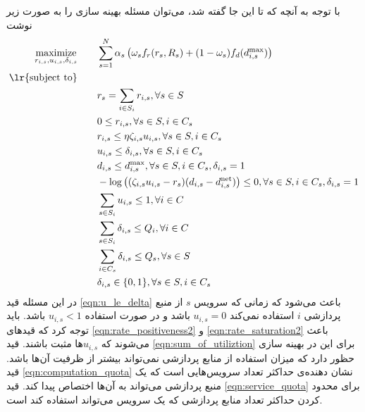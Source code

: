     با توجه به آنچه که تا این جا گفته شد،‌ می‌توان مسئله بهینه سازی را به صورت زیر نوشت
    \begin{subequations}
      \begin{align}
        \underset{r_{i,s}, u_{i,s}, \delta_{i,s}}{\text{maximize}} \qquad & \sum_{s=1}^N \alpha_s \left (\omega_s f_r(r_s, R_s) + (1-\omega_s) f_d(d_{i,s}^\text{max}) \right ) \\
        \text{\lr{subject  to}} \qquad & \nonumber \\
        & r_s = \sum_{i \in S_i} r_{i,s}, \forall s \in S \\
        & 0 \le r_{i,s}, \forall s \in S, i \in C_s \label{eqn:rate_positiveness2} \\
        & r_{i,s} \le \eta \zeta_{i,s} u_{i,s}, \forall s \in S, i \in C_s \label{eqn:rate_saturation2} \\
        & u_{i,s} \le \delta_{i,s}, \forall s \in S, i \in C_s \label{eqn:u_le_delta} \\
        & d_{i,s} \le d_{i,s}^\text{max}, \forall s \in S, i \in C_s, \delta_{i,s}=1 \\
        &- \log \left((\zeta_{i,s} u_{i,s} - r_s) (d_{i,s} - d_{i,s}^\text{net}) \right ) \le 0, \forall s \in S, i\in C_s, \delta_{i,s}=1 \\
        & \sum_{s \in S_i} u_{i,s} \le 1, \forall i \in C \label{eqn:sum_of_utiliztion} \\
        & \sum_{s \in S_i} \delta_{i,s} \le Q_i, \forall i \in C \label{eqn:computation_quota} \\
        & \sum_{i \in C_s} \delta_{i,s} \le Q_s, \forall s \in S \label{eqn:service_quota} \\
        & \delta_{i,s} \in \{0, 1\}, \forall s \in S, i \in C_s
      \end{align}
    \end{subequations}
    در این مسئله
    قید \eqref{eqn:u_le_delta} باعث می‌شود که زمانی که سرویس $s$ از منبع پردازشی $i$ استفاده نمی‌کند $u_{i,s}=0$ باشد و در صورت استفاده $u_{i,s}<1$ باشد.
    باید توجه کرد که قیدهای \cref{eqn:rate_positiveness2} و \cref{eqn:rate_saturation2} باعث می‌شوند که $u_{i,s}$ها مثبت باشند.
    قید \eqref{eqn:sum_of_utiliztion} برای این در بهینه سازی حظور دارد که میزان استفاده از منابع پردازشی نمی‌تواند بیشتر از ظرفیت آن‌ها باشد.
    قید \eqref{eqn:computation_quota} نشان دهنده‌ی حداکثر تعداد سرویس‌هایی است که یک منبع پردازشی می‌تواند به آن‌ها اختصاص پیدا کند.
    قید \eqref{eqn:service_quota} برای محدود کردن حداکثر تعداد منابع پردازشی که یک سرویس می‌تواند استفاده کند است.
    
